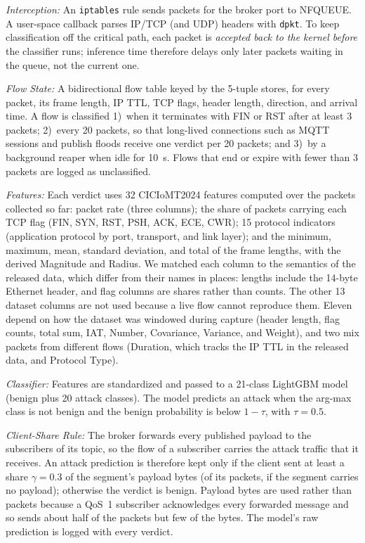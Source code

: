 \documentclass[journal]{IEEEtran}
\begin{document}
\textit{Interception:} An \texttt{iptables} rule sends packets for the broker port to NFQUEUE. A user-space callback parses IP/TCP (and UDP) headers with \texttt{dpkt}. To keep classification off the critical path, each packet is \emph{accepted back to the kernel before} the classifier runs; inference time therefore delays only later packets waiting in the queue, not the current one.

\textit{Flow State:} A bidirectional flow table keyed by the 5-tuple stores, for every packet, its frame length, IP TTL, TCP flags, header length, direction, and arrival time. A flow is classified 1)~when it terminates with FIN or RST after at least 3 packets; 2)~every 20 packets, so that long-lived connections such as MQTT sessions and publish floods receive one verdict per 20 packets; and 3)~by a background reaper when idle for 10~s. Flows that end or expire with fewer than 3 packets are logged as unclassified.

\textit{Features:} Each verdict uses 32 CICIoMT2024 features computed over the packets collected so far: packet rate (three columns); the share of packets carrying each TCP flag (FIN, SYN, RST, PSH, ACK, ECE, CWR); 15 protocol indicators (application protocol by port, transport, and link layer); and the minimum, maximum, mean, standard deviation, and total of the frame lengths, with the derived Magnitude and Radius. We matched each column to the semantics of the released data, which differ from their names in places: lengths include the 14-byte Ethernet header, and flag columns are shares rather than counts. The other 13 dataset columns are not used because a live flow cannot reproduce them. Eleven depend on how the dataset was windowed during capture (header length, flag counts, total sum, IAT, Number, Covariance, Variance, and Weight), and two mix packets from different flows (Duration, which tracks the IP TTL in the released data, and Protocol Type).

\textit{Classifier:} Features are standardized and passed to a 21-class LightGBM model~\cite{lightgbm2017} (benign plus 20 attack classes). The model predicts an attack when the arg-max class is not benign and the benign probability is below $1-\tau$, with $\tau = 0.5$.

\textit{Client-Share Rule:} The broker forwards every published payload to the subscribers of its topic, so the flow of a subscriber carries the attack traffic that it receives. An attack prediction is therefore kept only if the client sent at least a share $\gamma = 0.3$ of the segment's payload bytes (of its packets, if the segment carries no payload); otherwise the verdict is benign. Payload bytes are used rather than packets because a QoS~1 subscriber acknowledges every forwarded message and so sends about half of the packets but few of the bytes. The model's raw prediction is logged with every verdict.
\end{document}
